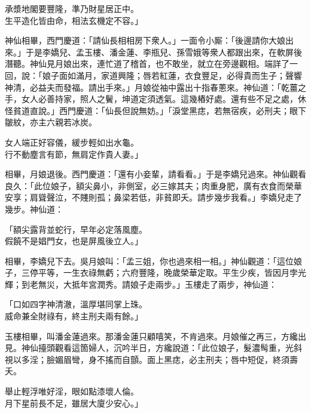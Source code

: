 \begin{myquote}
承漿地閣要豐隆，準乃財星居正中。\\生平造化皆由命，相法玄機定不容。」
\end{myquote}

神仙相畢，西門慶道：「請仙長相相房下衆人。」一面令小厮：「後邊請你大娘出來。」于是李嬌兒、孟玉樓、潘金蓮、李瓶兒、孫雪娥等衆人都跟出來，在軟屏後潛聽。神仙見月娘出來，連忙道了稽首，也不敢坐，就立在旁邊觀相。端詳了一回，說：「娘子面如滿月，家道興隆；唇若紅蓮，衣食豐足，必得貴而生子；聲響神清，必益夫而發福。請出手來。」月娘從袖中露出十指春蔥來。神仙道：「乾薑之手，女人必善持家，照人之鬢，坤道定須透氣。這幾樁好處。還有些不足之處，休怪貧道直說。」西門慶道：「仙長但說無妨。」「淚堂黑痣，若無宿疾，必刑夫；眼下皺紋，亦主六親若冰炭。

\begin{myquote}
女人端正好容儀，緩步輕如出水龜。\\行不動塵言有節，無肩定作貴人妻。」
\end{myquote}

相畢，月娘退後。西門慶道：「還有小妾輩，請看看。」于是李嬌兒過來。神仙觀看良久：「此位娘子，額尖鼻小，非側室，必三嫁其夫；肉重身肥，廣有衣食而榮華安享；肩聳聲泣，不賤則孤；鼻梁若低，非貧即夭。{}請步幾步我看。」李嬌兒走了幾步。神仙道：

\begin{myquote}
「額尖露背並蛇行，早年必定落風塵。\\假饒不是娼門女，也是屏風後立人。」
\end{myquote}

相畢，李嬌兒下去。吳月娘叫：「孟三姐，你也過來相一相。」神仙觀道：「這位娘子，三停平等，一生衣祿無虧；六府豐隆，晚歲榮華定取。平生少疾，皆因月孛光輝；到老無災，大抵年宮潤秀。請娘子走兩步。」玉樓走了兩步，神仙道：

\begin{myquote}
「口如四字神清澈，溫厚堪同掌上珠。\\威命兼全財祿有，終主刑夫兩有餘。」
\end{myquote}

玉樓相畢，叫潘金蓮過來。那潘金蓮只顧嘻笑，不肯過來。{}月娘催之再三，方纔出見。神仙擡頭觀看這箇婦人，沉吟半日，方纔說道：「此位娘子，髮濃髩重，{}光斜視以多淫；臉媚眉彎，身不搖而自顫。面上黑痣，必主刑夫；唇中短促，終須壽夭。

\begin{myquote}
舉止輕浮唯好淫，眼如點漆壞人倫。\\月下星前長不足，雖居大廈少安心。」
\end{myquote}

